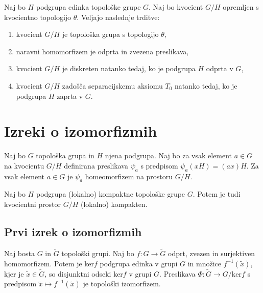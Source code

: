 \documentclass[mat1]{fmfdelo}
\begin{document}
\begin{izrek}\label{izr:kvocpovzetek}
Naj bo $H$ podgrupa edinka topološke grupe $G$. Naj bo kvocient $G/H$ opremljen s kvocientno topologijo $\theta$. Veljajo naslednje trditve:
\begin{enumerate}
\item kvocient $G/H$ je topološka grupa s topologijo $\theta$,
\item naravni homomorfizem je odprta in zvezena preslikava,
\item kvocient $G/H$ je diskreten natanko tedaj, ko je podgrupa $H$ odprta v $G$,
\item kvocient $G/H$ zadošča separacijskemu aksiomu $T_0$ natanko tedaj, ko je podgrupa $H$ zaprta v $G$.
\end{enumerate}
\end{izrek}

\section{Izreki o izomorfizmih}

\begin{trditev}\label{trd:homogenkvoc}
	Naj bo $G$ topološka grupa in $H$ njena podgrupa. Naj bo za vsak element $a \in G$ na kvocientu $G/H$ definirana preslikava $\psi_a$ s predpisom $\psi_a(xH) = (ax)H$.
	Za vsak element $a \in G$ je $\psi_a$ homeomorfizem na prostoru $G/H$.
\end{trditev}

\begin{trditev}\label{trd:kvockompakt}
	Naj bo $H$ podgrupa (lokalno) kompaktne topološke grupe $G$. Potem je tudi kvocientni prostor $G/H$ (lokalno) kompakten.
\end{trditev}

\subsection{Prvi izrek o izomorfizmih}
\begin{izrek}\label{izr:prvitopizrek}
Naj bosta $G$ in $\widetilde{G}$ topološki grupi. Naj bo $f: G \to \widetilde{G}$ odprt, zvezen in surjektiven homomorfizem. Potem je ker$f$ podgrupa edinka v grupi $G$ in množice $f^{-1}(\tilde{x})$, kjer je $\tilde{x} \in \widetilde{G}$, so disjunktni odseki ker$f$ v grupi $G$. Preslikava $\Phi:\widetilde{G} \to G/\text{ker}f$ s predpisom $\tilde{x} \mapsto f^{-1}(\tilde{x})$ je topološki izomorfizem.
\end{izrek}
\end{document}
